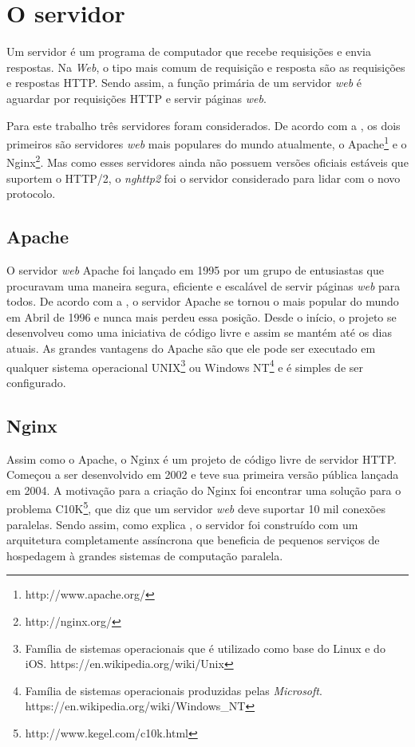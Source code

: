 \section{O servidor}
\label{oservidor}

Um servidor é um programa de computador que recebe requisições e envia respostas. Na \textit{Web}, o tipo mais comum de requisição e resposta são as requisições e respostas HTTP. Sendo assim, a função primária de um servidor \textit{web} é aguardar por requisições HTTP e servir páginas \textit{web}.

Para este trabalho três servidores foram considerados. De acordo com a , os dois primeiros são servidores \textit{web} mais populares do mundo atualmente, o Apache\footnote{http://www.apache.org/} e o Nginx\footnote{http://nginx.org/}. Mas como esses servidores ainda não possuem versões oficiais estáveis que suportem o HTTP/2, o \textit{nghttp2} foi o servidor considerado para lidar com o novo protocolo.

\subsection{Apache}
\label{apache}

O servidor \textit{web} Apache foi lançado em 1995 por um grupo de entusiastas que procuravam uma maneira segura, eficiente e escalável de servir páginas \textit{web} para todos.  De acordo com a , o servidor Apache se tornou o mais popular do mundo em Abril de 1996 e nunca mais perdeu essa posição. Desde o início, o projeto se desenvolveu como uma iniciativa de código livre e assim se mantém até os dias atuais. As grandes vantagens do Apache são que ele pode ser executado em qualquer sistema operacional UNIX\footnote{Família de sistemas operacionais que é utilizado como base do Linux e do iOS. https://en.wikipedia.org/wiki/Unix} ou Windows NT\footnote{Família de sistemas operacionais produzidas pelas \textit{Microsoft}. https://en.wikipedia.org/wiki/Windows\_NT} e é simples de ser configurado.

\subsection{Nginx}
\label{nginx}

Assim como o Apache, o Nginx é um projeto de código livre de servidor HTTP. Começou a ser desenvolvido em 2002 e teve sua primeira versão pública lançada em 2004. A motivação para a criação do Nginx foi encontrar uma solução para o problema C10K\footnote{http://www.kegel.com/c10k.html}, que diz que um servidor \textit{web} deve suportar 10 mil conexões paralelas. Sendo assim, como explica , o servidor foi construído com um arquitetura completamente assíncrona que beneficia de pequenos serviços de hospedagem à grandes sistemas de computação paralela.


